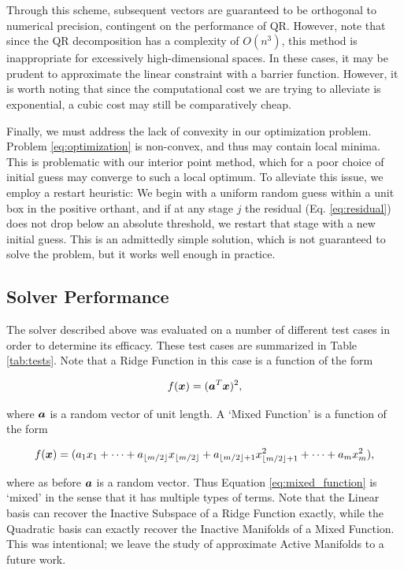 \documentclass[]{aiaa-tc}%
\begin{document}
Through this scheme, subsequent vectors are guaranteed to be orthogonal to numerical precision, contingent on the performance of QR. However, note that since the QR decomposition has a complexity of $O(n^3)$, this method is inappropriate for excessively high-dimensional spaces. In these cases, it may be prudent to approximate the linear constraint with a barrier function. However, it is worth noting that since the computational cost we are trying to alleviate is exponential, a cubic cost may still be comparatively cheap.

Finally, we must address the lack of convexity in our optimization problem. Problem \ref{eq:optimization} is non-convex, and thus may contain local minima. This is problematic with our interior point method, which for a poor choice of initial guess may converge to such a local optimum. To alleviate this issue, we employ a restart heuristic: We begin with a uniform random guess within a unit box in the positive orthant, and if at any stage $j$ the residual (Eq. \ref{eq:residual}) does not drop below an absolute threshold, we restart that stage with a new initial guess. This is an admittedly simple solution, which is not guaranteed to solve the problem, but it works well enough in practice.

\subsection{Solver Performance} \label{sec:solver_performance}
The solver described above was evaluated on a number of different test cases in order to determine its efficacy. These test cases are summarized in Table \ref{tab:tests}. Note that a Ridge Function in this case is a function of the form 

\begin{equation}
\label{eq:ridge_function}
f(\vx)=(\va^T\vx)^2, 
\end{equation}

where $\boldsymbol{a}$ is a random vector of unit length. A `Mixed Function' is a function of the form 

\begin{equation}
\label{eq:mixed_function}
f(\vx)=(a_1x_1+\dots+a_{\floor*{m/2}}x_{\floor*{m/2}}+a_{\floor*{m/2}+1}x_{\floor*{m/2}+1}^2+\dots+a_mx_m^2),
\end{equation}

where as before $\boldsymbol{a}$ is a random vector. Thus Equation \ref{eq:mixed_function} is `mixed' in the sense that it has multiple types of terms. Note that the Linear basis can recover the Inactive Subspace of a Ridge Function exactly, while the Quadratic basis can exactly recover the Inactive Manifolds of a Mixed Function. This was intentional; we leave the study of approximate Active Manifolds to a future work. 
\end{document}

